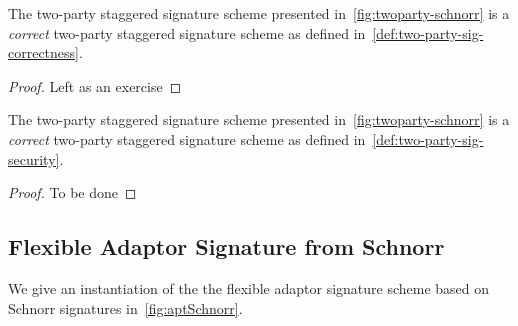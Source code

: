 \begin{theorem} The two-party staggered signature scheme presented in~\cref{fig:twoparty-schnorr} is a \emph{correct}  two-party staggered signature scheme as defined in~\cref{def:two-party-sig-correctness}. 
\end{theorem}

\begin{proof}
	Left as an exercise
\end{proof}


\begin{theorem} The two-party staggered signature scheme presented in~\cref{fig:twoparty-schnorr} is a \emph{correct}  two-party staggered signature scheme as defined in~\cref{def:two-party-sig-security}. 
\end{theorem}

\begin{proof}
	To be done
\end{proof}


\subsection{Flexible Adaptor Signature from Schnorr}
We give an instantiation of the the flexible adaptor signature scheme based on Schnorr signatures in~\cref{fig:aptSchnorr}.  




